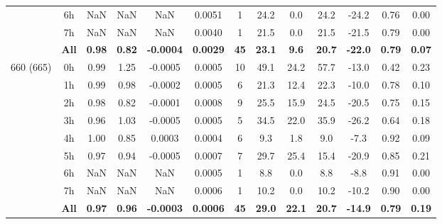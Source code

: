 \documentclass[preview]{standalone}
\begin{document}
\begin{tabular}{ccccccccccccc}
 & 6h   & NaN & NaN & NaN & 0.0051 &  1 & 24.2 & 0.0 & 24.2 & -24.2 & 0.76 & 0.00 \\ 
 & 7h   & NaN & NaN & NaN & 0.0040 &  1 & 21.5 & 0.0 & 21.5 & -21.5 & 0.79 & 0.00 \\ \cline{2-13}
 & \textbf{All}  & \textbf{0.98} & \textbf{0.82} & \textbf{-0.0004} & \textbf{0.0029} & \textbf{45} & \textbf{23.1} & \textbf{9.6} & \textbf{20.7} & \textbf{-22.0} & \textbf{0.79} & \textbf{0.07} \\ \hline
\multirow{9}{*}{660 (665)} & 0h  & 0.99 & 1.25 & -0.0005 & 0.0005 & 10 & 49.1 & 24.2 & 57.7 & -13.0 & 0.42 & 0.23 \\ 
 & 1h   & 0.99 & 0.98 & -0.0002 & 0.0005 &  6 & 21.3 & 12.4 & 22.3 & -10.0 & 0.78 & 0.10 \\ 
 & 2h   & 0.98 & 0.82 & -0.0001 & 0.0008 &  9 & 25.5 & 15.9 & 24.5 & -20.5 & 0.75 & 0.15 \\ 
 & 3h   & 0.96 & 1.03 & -0.0005 & 0.0005 &  5 & 34.5 & 22.0 & 35.9 & -26.2 & 0.64 & 0.18 \\ 
 & 4h   & 1.00 & 0.85 & 0.0003 & 0.0004 &  6 & 9.3 & 1.8 & 9.0 & -7.3 & 0.92 & 0.09 \\ 
 & 5h   & 0.97 & 0.94 & -0.0005 & 0.0007 &  7 & 29.7 & 25.4 & 15.4 & -20.9 & 0.85 & 0.21 \\ 
 & 6h   & NaN & NaN & NaN & 0.0005 &  1 & 8.8 & 0.0 & 8.8 & -8.8 & 0.91 & 0.00 \\ 
 & 7h   & NaN & NaN & NaN & 0.0006 &  1 & 10.2 & 0.0 & 10.2 & -10.2 & 0.90 & 0.00 \\ \cline{2-13}
 & \textbf{All}  & \textbf{0.97} & \textbf{0.96} & \textbf{-0.0003} & \textbf{0.0006} & \textbf{45} & \textbf{29.0} & \textbf{22.1} & \textbf{20.7} & \textbf{-14.9} & \textbf{0.79} & \textbf{0.19} \\ \hline
\hline 
\end{tabular}
\end{document}
